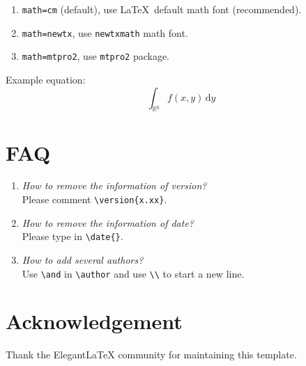 \begin{enumerate}
  \item \lstinline{math=cm} (default), use \LaTeX\ default math font (recommended).
  \item \lstinline{math=newtx}, use \lstinline{newtxmath} math font.
  \item \lstinline{math=mtpro2}, use \lstinline{mtpro2} package.
\end{enumerate}

Example equation:
\begin{equation}
\int_{\mathbb{R}^q} f(x,y)\, \mathrm{d}y
\end{equation}

\section{FAQ}

\begin{enumerate}[label=\arabic*).]
  \item \textit{How to remove the information of version?}\\
  Please comment \lstinline|\version{x.xx}|.
  \item \textit{How to remove the information of date?}\\
  Please type in \lstinline|\date{}|.
  \item \textit{How to add several authors?}\\
  Use \lstinline{\and} in \lstinline{\author} and use \lstinline{\\} to start a new line.
\end{enumerate}

\section{Acknowledgement}

Thank the ElegantLaTeX community for maintaining this template.

\printbibliography[heading=bibintoc, title=\ebibname]

\appendix
\addappheadtotoc

